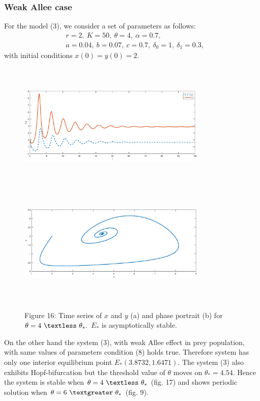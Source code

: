 \documentclass[a4paper, 10pt]{article}
\begin{document}
\subsubsection{Weak Allee case}
For the model (3), we consider a set of parameters as follows:
\begin{equation}
\begin{split}
& r=2,~K=50,~\theta=4,~\alpha=0.7,\\
& a=0.04,~b=0.07,~c=0.7,~\delta_0=1,~\delta_1=0.3,
\end{split}
\end{equation}
with initial conditions $x(0)=y(0)=2.$
\begin{figure}[H]
	{\includegraphics[width=9cm, height=6cm]{23a.eps}}
	\endminipage\hfill
	{\includegraphics[width=9cm, height=6cm]{23b.eps}}
	\endminipage\hfill
	\begin{center} Figure 16: Time series of $x$ and $y$ (a) and phase portrait (b) for $\theta=4~\textless~\theta_*.$ $E_*$ is asymptotically stable.  \end{center}
\end{figure}
On the other hand the system (3), with weak Allee effect in prey population, with same values of parameters condition (8) holds true. Therefore system has only one interior equilibrium point $E_*(3.8732,1.6471)$. The system (3) also exhibits Hopf-bifurcation but the threshold value of $\theta$ moves on $\theta_*=4.54.$ Hence the system is stable when $\theta=4 ~\textless~\theta_*$ (fig. 17) and shows periodic solution when  $\theta=6~\textgreater~\theta_*$ (fig. 9).
\end{document}
